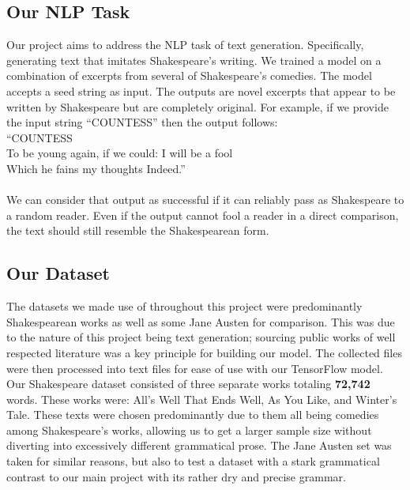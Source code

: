 \documentclass[11pt,a4paper]{article}
\begin{document}
\subsection{Our NLP Task}
Our project aims to address the NLP task of text generation. Specifically, generating text that imitates Shakespeare’s writing. We trained a model on a combination of excerpts from several of Shakespeare’s comedies. The model accepts a seed string as input. The outputs are novel excerpts that appear to be written by Shakespeare but are completely original. For example, if we provide the input string “COUNTESS” then the output follows:  \\
\linebreak
“COUNTESS \\
To be young again, if we could: I will be a fool\\
Which he fains my thoughts Indeed.”\\
\linebreak\\
We can consider that output as successful if it can reliably pass as Shakespeare to a random reader. Even if the output cannot fool a reader in a direct comparison, the text should still resemble the Shakespearean form.

\subsection{Our Dataset}
\label{sec:data}
The datasets we made use of throughout this project were predominantly Shakespearean works\cite{complete} as well as some Jane Austen for comparison. This was due to the nature of this project being text generation; sourcing public works of well respected literature was a key principle for building our model. The collected files were then processed into text files for ease of use with our TensorFlow\cite{tensor} model. Our Shakespeare dataset consisted of three separate works totaling \textbf{72,742} words. These works were: All’s Well That Ends Well, As You Like, and Winter's Tale. These texts were chosen predominantly due to them all being comedies among Shakespeare's works, allowing us to get a larger sample size without diverting into excessively different grammatical prose. The Jane Austen set was taken for similar reasons, but also to test a dataset with a stark grammatical contrast to our main project with its rather dry and precise grammar.
\end{document}
